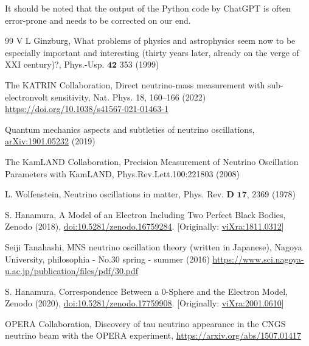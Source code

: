 \documentclass[%
 reprint,
 amsmath,amssymb,
 aps,
]{revtex4-1}
\numberwithin{equation}{section}%
\begin{document}
It should be noted that the output of the Python code by ChatGPT is often error-prone and needs to be corrected on our end.


\begin{thebibliography}{99}
     V L Ginzburg, What problems of physics and astrophysics seem now to be especially important and interesting (thirty years later, already on the verge of XXI century)?, Phys.-Usp. $\textbf{42}$ 353 (1999)
    
     The KATRIN Collaboration, Direct neutrino-mass measurement with sub-electronvolt sensitivity, Nat. Phys. 18, 160–166 (2022) \href{https://doi.org/10.1038/s41567-021-01463-1}{https://doi.org/10.1038/s41567-021-01463-1}
    
     Quantum mechanics aspects and subtleties of neutrino oscillations, \href{https://arxiv.org/abs/1901.05232}{arXiv:1901.05232} (2019)
 
     The KamLAND Collaboration, Precision Measurement of Neutrino Oscillation Parameters with KamLAND, Phys.Rev.Lett.100:221803 (2008)
    
     L. Wolfenstein, Neutrino oscillations in matter, Phys. Rev. $\textbf{D 17}$, 2369 (1978)
    
     S. Hanamura, A Model of an Electron Including Two Perfect Black Bodies, Zenodo (2018), \href{https://doi.org/10.5281/zenodo.16759284}{doi:10.5281/zenodo.16759284}. [Originally: \href{http://vixra.org/abs/1811.0312}{viXra:1811.0312}]
    
     Seiji Tanahashi, MNS neutrino oscillation theory (written in Japanese), Nagoya University, philosophia - No.30 spring - summer (2016)
    \href{https://www.sci.nagoya-u.ac.jp/publication/files/pdf/30.pdf}{https://www.sci.nagoya-u.ac.jp/publication/files/pdf/30.pdf}
    
     S. Hanamura, Correspondence Between a 0-Sphere and the Electron Model, Zenodo (2020), \href{https://doi.org/10.5281/zenodo.17759908}{doi:10.5281/zenodo.17759908}. [Originally: \href{https://vixra.org/abs/2001.0610}{viXra:2001.0610}]
    
     OPERA Collaboration, Discovery of tau neutrino appearance in the CNGS neutrino beam with the OPERA experiment, \href{https://arxiv.org/abs/1507.01417}{https://arxiv.org/abs/1507.01417}
    

\end{thebibliography}
\end{document}
